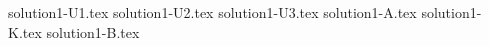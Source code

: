 \documentclass{article}
\begin{document}
{solution1-U1.tex}
{solution1-U2.tex}
{solution1-U3.tex}
{solution1-A.tex}
{solution1-K.tex}
{solution1-B.tex}
\end{document}
